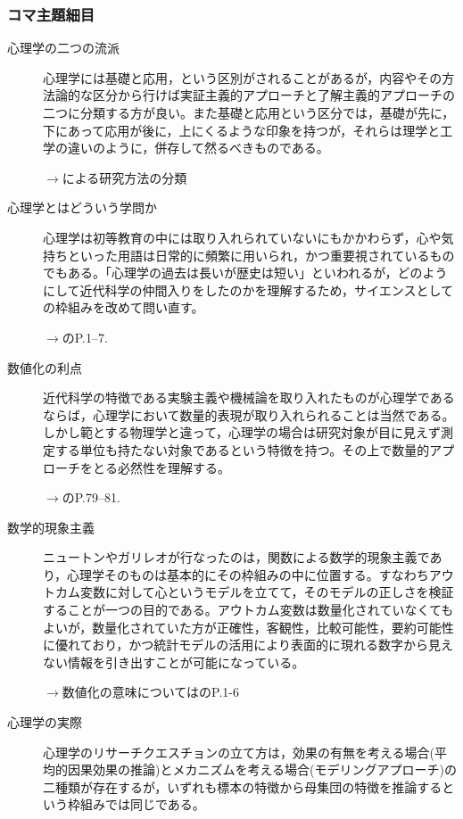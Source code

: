 \subsubsection{コマ主題細目}
\begin{description}
\item[心理学の二つの流派] 心理学には基礎と応用，という区別がされることがあるが，内容やその方法論的な区分から行けば実証主義的アプローチと了解主義的アプローチの二つに分類する方が良い。また基礎と応用という区分では，基礎が先に，下にあって応用が後に，上にくるような印象を持つが，それらは理学と工学の違いのように，併存して然るべきものである。
\begin{flushright}
    $\to$\citet{下山2001}による研究方法の分類
\end{flushright}

\item[心理学とはどういう学問か] 心理学は初等教育の中には取り入れられていないにもかかわらず，心や気持ちといった用語は日常的に頻繁に用いられ，かつ重要視されているものでもある。「心理学の過去は長いが歴史は短い」といわれるが，どのようにして近代科学の仲間入りをしたのかを理解するため，サイエンスとしての枠組みを改めて問い直す。
\begin{flushright}
    $\to$\citet{三浦201705}のP.1--7.
\end{flushright}

\item[数値化の利点] 近代科学の特徴である実験主義や機械論を取り入れたものが心理学であるならば，心理学において数量的表現が取り入れられることは当然である。しかし範とする物理学と違って，心理学の場合は研究対象が目に見えず測定する単位も持たない対象であるという特徴を持つ。その上で数量的アプローチをとる必然性を理解する。
\begin{flushright}
    $\to$\citet{三浦201705}のP.79--81.
\end{flushright}

\item[数学的現象主義] ニュートンやガリレオが行なったのは，関数による数学的現象主義であり，心理学そのものは基本的にその枠組みの中に位置する。すなわちアウトカム変数に対して心というモデルを立てて，そのモデルの正しさを検証することが一つの目的である。アウトカム変数は数量化されていなくてもよいが，数量化されていた方が正確性，客観性，比較可能性，要約可能性に優れており，かつ統計モデルの活用により表面的に現れる数字から見えない情報を引き出すことが可能になっている。
\begin{flushright}
    $\to$数値化の意味については\citet{川端201408}のP.1-6
\end{flushright}

\item[心理学の実際] 心理学のリサーチクエスチョンの立て方は，効果の有無を考える場合(平均的因果効果の推論)とメカニズムを考える場合(モデリングアプローチ)の二種類が存在するが，いずれも標本の特徴から母集団の特徴を推論するという枠組みでは同じである。


\end{description}
